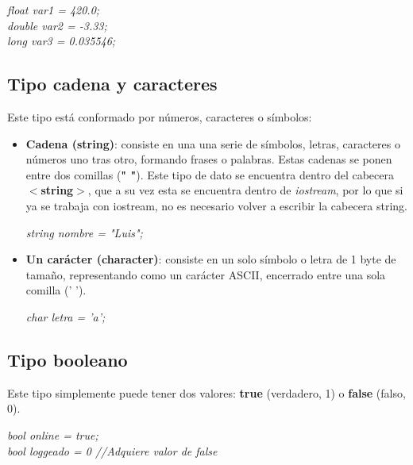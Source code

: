 \begin{center}
    \textit{float var1 = 420.0;\\
            double var2 = -3.33;\\
            long var3 = 0.035546;}
\end{center}

\subsection{Tipo cadena y caracteres}
Este tipo está conformado por números, caracteres o símbolos:
\begin{itemize}
    \item \textbf{Cadena (string)}: consiste en una una serie de símbolos, letras, caracteres o números uno tras otro, formando frases o palabras. Estas cadenas se ponen entre dos comillas (\textbf{" "}). Este tipo de dato se encuentra dentro del cabecera \textbf{$<$string$>$}, que a su vez esta se encuentra dentro de \textit{iostream}, por lo que si ya se trabaja con iostream, no es necesario volver a escribir la cabecera string.\begin{center}\textit{string nombre = "Luis";}\end{center}
    \item \textbf{Un carácter (character)}: consiste en un solo símbolo o letra de 1 byte de tamaño, representando como un carácter ASCII, encerrado entre una sola comilla (' ').\begin{center}\textit{char letra = 'a';}\end{center}
\end{itemize}

\subsection{Tipo booleano}
Este tipo simplemente puede tener dos valores: \textbf{true} (verdadero, 1) o \textbf{false} (falso, 0).
\begin{center}
    \textit{bool online = true;\\
            bool loggeado = 0 //Adquiere valor de false}
\end{center}



